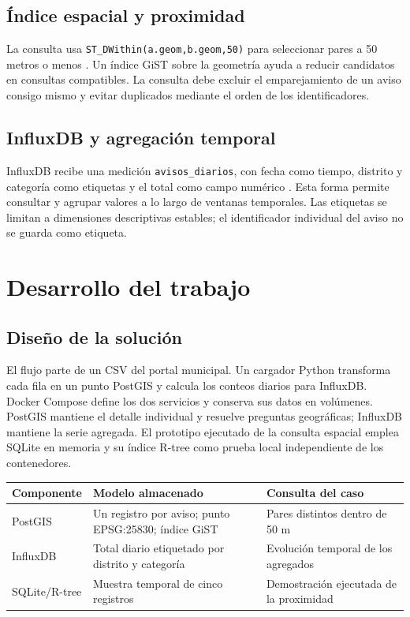 \documentclass[a4paper,12pt]{article}
\begin{document}
\subsection{Índice espacial y proximidad}
La consulta usa \texttt{ST\_DWithin(a.geom,b.geom,50)} para seleccionar pares a 50 metros o menos \cite{postgis}. Un índice GiST sobre la geometría ayuda a reducir candidatos en consultas compatibles. La consulta debe excluir el emparejamiento de un aviso consigo mismo y evitar duplicados mediante el orden de los identificadores.
\subsection{InfluxDB y agregación temporal}
InfluxDB recibe una medición \texttt{avisos\_diarios}, con fecha como tiempo, distrito y categoría como etiquetas y el total como campo numérico \cite{influx}. Esta forma permite consultar y agrupar valores a lo largo de ventanas temporales. Las etiquetas se limitan a dimensiones descriptivas estables; el identificador individual del aviso no se guarda como etiqueta.
\section{Desarrollo del trabajo}
\subsection{Diseño de la solución}
El flujo parte de un CSV del portal municipal. Un cargador Python transforma cada fila en un punto PostGIS y calcula los conteos diarios para InfluxDB. Docker Compose define los dos servicios y conserva sus datos en volúmenes. PostGIS mantiene el detalle individual y resuelve preguntas geográficas; InfluxDB mantiene la serie agregada. El prototipo ejecutado de la consulta espacial emplea SQLite en memoria y su índice R-tree como prueba local independiente de los contenedores.

\begin{center}\small
\begin{tabularx}{\textwidth}{lXX}\toprule
Componente & Modelo almacenado & Consulta del caso\\\midrule
PostGIS & Un registro por aviso; punto EPSG:25830; índice GiST & Pares distintos dentro de 50 m\\
InfluxDB & Total diario etiquetado por distrito y categoría & Evolución temporal de los agregados\\
SQLite/R-tree & Muestra temporal de cinco registros & Demostración ejecutada de la proximidad\\\bottomrule
\end{tabularx}\end{center}
\end{document}
